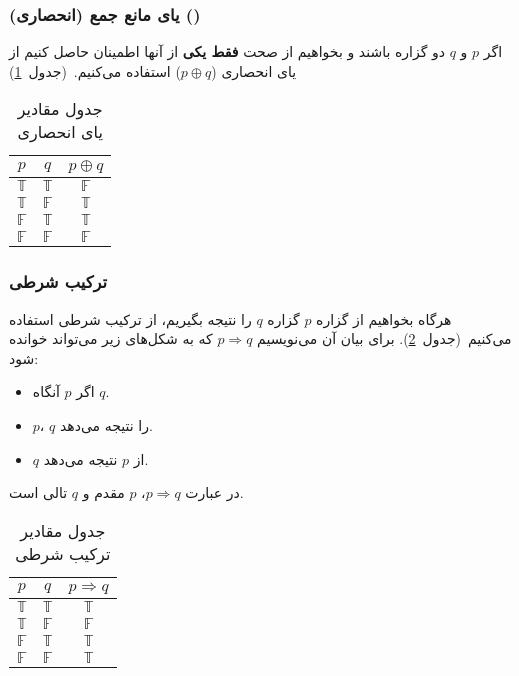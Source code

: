 \documentclass[a4paper, margin=1in]{article}
\newcommand{\T}{$\mathbb{T}$}
\newcommand{\F}{$\mathbb{F}$}
\newcommand{\reft}[1]{~(جدول~\ref{tb:#1})}
\begin{document}
\subsubsection{یای مانع جمع (انحصاری) ()}
اگر $p$ و $q$ دو گزاره باشند و بخواهیم از صحت \textbf{فقط یکی} از آنها اطمینان حاصل کنیم از یای انحصاری ($p \oplus q$) استفاده می‌کنیم.\reft{xor}

\begin{table}[h]\centering
  \begin{LTR}
    \begin{tabular}{c c|c}
      $p$ & $q$ & $p \oplus q$ \\
      \hline
      \T & \T & \F \\
      \T & \F & \T \\
      \F & \T & \T \\
      \F & \F & \F \\
    \end{tabular}
  \end{LTR}
  \caption{جدول مقادیر یای انحصاری}\label{tb:xor}
\end{table}

\subsubsection{ترکیب شرطی}
هرگاه بخواهیم از گزاره $p$ گزاره $q$ را نتیجه بگیریم، از ترکیب شرطی استفاده می‌کنیم\reft{imp}. برای بیان آن می‌نویسیم $p \Rightarrow q$ که به شکل‌های زیر می‌تواند خوانده شود:
\begin{itemize}
  \item اگر $p$ آنگاه $q$.
  \item $p$، $q$ را نتیجه می‌دهد.
  \item $q$ از $p$ نتیجه می‌دهد.
\end{itemize}
در عبارت $p \Rightarrow q$، $p$ مقدم و $q$ تالی است.

\begin{table}[h]\centering
  \begin{LTR}
    \begin{tabular}{c c|c}
      $p$ & $q$ & $p \Rightarrow q$ \\
      \hline
      \T & \T & \T \\
      \T & \F & \F \\
      \F & \T & \T \\
      \F & \F & \T \\
    \end{tabular}
  \end{LTR}
  \caption{جدول مقادیر ترکیب شرطی}\label{tb:imp}
\end{table}
\end{document}
